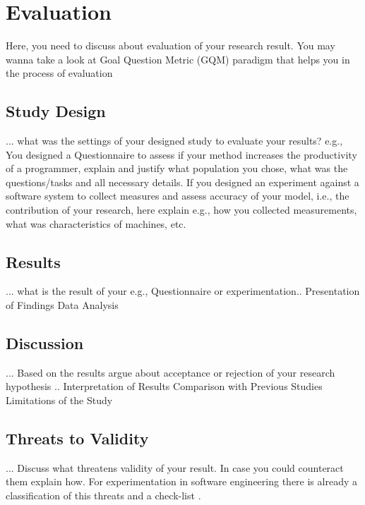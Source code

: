 
\chapter{Evaluation}
\label{chap:evaluation}

Here, you need to discuss about evaluation of your research result. You may wanna take a look at Goal Question Metric (GQM) paradigm that helps you in the process of evaluation \cite{caldiera1994goal}

\section{Study Design}
... what was the settings of your designed study to evaluate your results? e.g., You designed a Questionnaire to assess if your method increases the productivity of a programmer, explain and justify what population you chose, what was the questions/tasks and all necessary details. If you designed an experiment against a software system to collect measures and assess accuracy of your model, i.e., the contribution of your research, here explain e.g., how you collected measurements, what was characteristics of machines, etc.

\section{Results}
... what is the result of your e.g., Questionnaire or experimentation.. 
Presentation of Findings
Data Analysis

\section{Discussion}
... Based on the results argue about acceptance or rejection of your research hypothesis   .. 
Interpretation of Results
Comparison with Previous Studies
Limitations of the Study

\section{Threats to Validity}
... Discuss what threatens validity of your result. In case you could counteract them explain how. For experimentation in software engineering there is already a classification of this threats and a check-list \cite{DBLP:journals/ese/RunesonH09}.   

